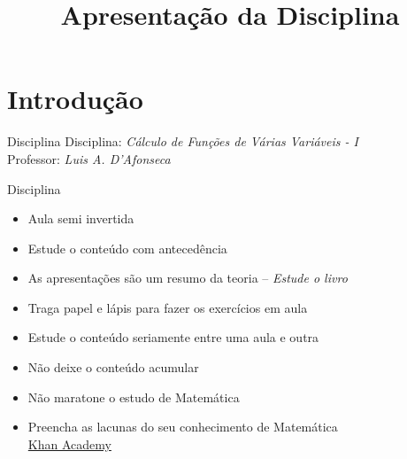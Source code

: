 \documentclass[fleqn,utf8,aspectratio=169,12pt]{beamer}
\title{Apresentação da Disciplina}
\begin{document}
\addtitle

\section{Introdução}

\begin{frame}{Disciplina}
   Disciplina: \emph{\large Cálculo de Funções de Várias Variáveis - I}\\[7mm]
   Professor: \emph{\large Luis A. D'Afonseca}
\end{frame}

\begin{frame}{Disciplina}
\begin{itemize}[<+->]
  \item Aula semi invertida
  \item Estude o conteúdo com antecedência
  \item As apresentações são um resumo da teoria -- \emph{Estude o livro}
  \item Traga papel e lápis para fazer os exercícios em aula
  \item Estude o conteúdo seriamente entre uma aula e outra
  \item Não deixe o conteúdo acumular
  \item Não maratone o estudo de Matemática
  \item Preencha as lacunas do seu conhecimento de Matemática \\
        \href{https://pt.khanacademy.org}{Khan Academy}
\end{itemize}
\end{frame}


\end{document}
